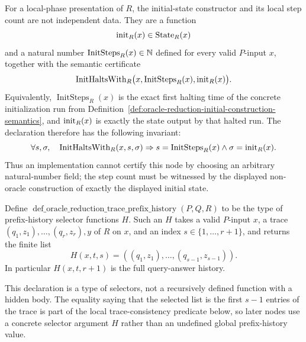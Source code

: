 \begin{definition}
  \label{def:oracle-reduction-initial-state}
  For a local-phase presentation of $R$, the initial-state constructor and its
  local step count are not independent data.  They are a function
  \[
    \operatorname{init}_R(x)\in\operatorname{State}_R(x)
  \]
  and a natural number $\operatorname{InitSteps}_R(x)\in\mathbb{N}$ defined for every
  valid $P$-input $x$, together with the semantic certificate
  \[
    \operatorname{InitHaltsWith}_R
      \bigl(x,\operatorname{InitSteps}_R(x),\operatorname{init}_R(x)\bigr).
  \]
  Equivalently,
  $\operatorname{InitSteps}_R(x)$ is the exact first halting time of the
  concrete initialization run from
  Definition~\ref{def:oracle-reduction-initial-construction-semantics}, and
  $\operatorname{init}_R(x)$ is exactly the state output by that halted run.  The declaration
  therefore has the following invariant:
  \[
    \forall s,\sigma,\quad
    \operatorname{InitHaltsWith}_R(x,s,\sigma)
    \Rightarrow
    s=\operatorname{InitSteps}_R(x)\wedge \sigma=\operatorname{init}_R(x).
  \]
  Thus an implementation cannot certify this node by choosing an arbitrary
  natural-number field; the step count must be witnessed by the displayed
  non-oracle construction of exactly the displayed initial state.
\end{definition}

\begin{definition}
  \label{def:oracle-reduction-trace-prefix-history}
  Define
  $\operatorname{def\_oracle\_reduction\_trace\_prefix\_history}(P,Q,R)$ to be
  the type of prefix-history selector functions $H$.  Such an $H$ takes a
  valid $P$-input $x$, a trace
  $(q_1,z_1),\ldots,(q_r,z_r),y$ of $R$ on $x$, and an index
  $s\in\{1,\ldots,r+1\}$, and returns the finite list
  \[
    H(x,t,s)=((q_1,z_1),\ldots,(q_{s-1},z_{s-1})).
  \]
  In particular $H(x,t,r+1)$ is the full query-answer history.

  This declaration is a type of selectors, not a recursively defined function
  with a hidden body.  The equality saying that the selected list is the first
  $s-1$ entries of the trace is part of the local trace-consistency predicate
  below, so later nodes use a concrete selector argument $H$ rather than an
  undefined global prefix-history value.
\end{definition}

